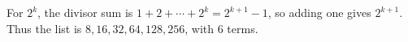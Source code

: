 For $2^k$, the divisor sum is $1+2+\cdots+2^k=2^{k+1}-1$, so adding one gives $2^{k+1}$. Thus the list is $8,16,32,64,128,256$, with $\boxed6$ terms.
